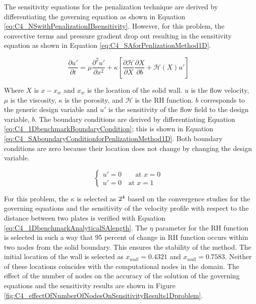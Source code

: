 The sensitivity equations for the penalization technique are derived by differentiating the governing equation as shown in Equation \eqref{eq:C4_NSwithPenalizationIBsensitivity}. However, for this problem, the convective terms and pressure gradient drop out resulting in the sensitivity equation as shown in Equation \eqref{eq:C4_SAforPenlizationMethod1D}.

\begin{equation}\label{eq:C4_SAforPenlizationMethod1D}
    \frac{\partial u'}{\partial t} = 
    \mu \frac{\partial^2 u'}{\partial x^2} +
    \kappa \left[
    \frac{\partial \mathcal{H}}{\partial X} \frac{\partial X}{\partial b} + 
    \mathcal{H}(X) u'
    \right]
\end{equation}

Where $X$ is $x - x_w$ and $x_w$ is the location of the solid wall. $u$ is the flow velocity, $\mu$ is the viscosity, $\kappa$ is the porosity, and $\mathcal{H}$ is the RH function. $b$ corresponds to the generic design variable and $u'$ is the sensitivity of the flow field to the design variable, $b$. The boundary conditions are derived by differentiating Equation \eqref{eq:C4_1DbenchmarkBoundaryCondition}; this is shown in Equation \eqref{eq:C4_SAboundaryConditionforPenlizationMethod1D}. Both boundary conditions are zero because their location does not change by changing the design variable.

\begin{equation}\label{eq:C4_SAboundaryConditionforPenlizationMethod1D}
\begin{cases}
    u' = 0 \qquad \text{at } x = 0 \\
    u' = 0 \quad \text{at } x = 1
\end{cases}
\end{equation}

For this problem, the $\kappa$ is selected as $2 \time 10^4$ based on the convergence studies for the governing equations and the sensitivity of the velocity profile with respect to the distance between two plates is verified with Equation \eqref{eq:C4_1DbenchmarkAnalyticalSAlength}. The $\eta$ parameter for the RH function is selected in such a way that 95 percent of change in RH function occurs within two nodes from the solid boundary. This ensures the stability of the method. The initial location of the wall is selected as $x_{wall} = 0.4321$ and $x_{wall} = 0.7583$. Neither of these locations coincides with the computational nodes in the domain. The effect of the number of nodes on the accuracy of the solution of the governing equations and the sensitivity results are shown in Figure \ref{fig:C4_effectOfNumberOfNodesOnSensitivityResults1Dproblem}.

